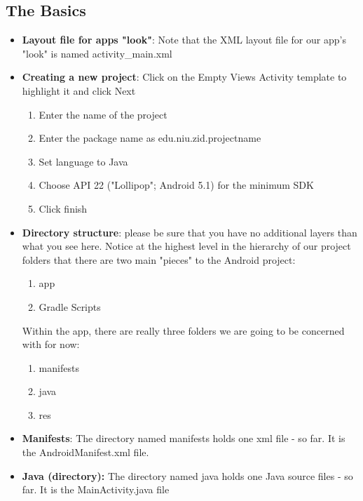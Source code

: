 \documentclass{report}
\begin{document}
    \subsection{The Basics}
    \begin{itemize}
        \item \textbf{Layout file for apps "look"}: Note that the XML layout file for our app's "look" is named activity\_main.xml
        \item \textbf{Creating a new project}: Click on the Empty Views Activity template to highlight it and click Next
            \begin{enumerate}
                \item Enter the name of the project
                \item Enter the package name as edu.niu.zid.projectname
                \item Set language to Java
                \item Choose API 22 ("Lollipop"; Android 5.1) for the minimum SDK
                \item Click finish
            \end{enumerate}
        \item \textbf{Directory structure}: please be sure that you have no additional layers than what you see here.
            \bigbreak \noindent 
            \bigbreak \noindent 
            Notice at the highest level in the hierarchy of our project folders that there are two main "pieces" to the Android project:
            \begin{enumerate}
                \item app
                \item Gradle Scripts
            \end{enumerate}
            \bigbreak \noindent 
            Within the app, there are really three folders we are going to be concerned with for now:
            \begin{enumerate}
                \item manifests
                \item java
                \item res
            \end{enumerate}
        \item \textbf{Manifests}: The directory named manifests holds one xml file - so far. It is the AndroidManifest.xml file.
        \item \textbf{Java (directory):} The directory named java holds one Java source files - so far. It is the MainActivity.java file

\end{itemize}
\end{document}
